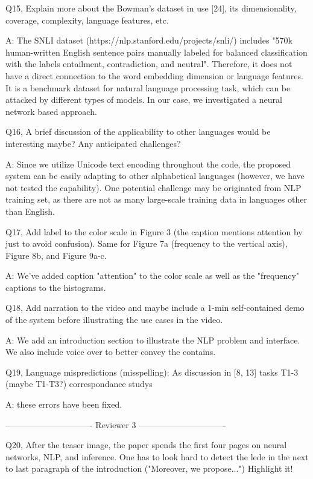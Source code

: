 Q15, Explain more about the Bowman's dataset in use [24], its dimensionality, coverage, complexity, language features, etc.

A: The SNLI dataset (https://nlp.stanford.edu/projects/snli/) includes "570k human-written English sentence pairs manually labeled for balanced classification with the labels entailment, contradiction, and neutral". Therefore, it does not have a direct connection to the word embedding dimension or language features. It is a benchmark dataset for natural language processing task, which can be attacked by different types of models. In our case, we investigated a neural network based approach.

Q16, A brief discussion of the applicability to other languages would be interesting maybe? Any anticipated challenges?

A: Since we utilize Unicode text encoding throughout the code, the proposed system can be easily adapting to other alphabetical languages (however, we have not tested the capability). One potential challenge may be originated from NLP training set, as there are not as many large-scale training data in languages other than English.

Q17, Add label to the color scale in Figure 3 (the caption mentions attention by just to avoid confusion). Same for Figure 7a (frequency to the vertical axis), Figure 8b, and Figure 9a-c.

A: We've added caption "attention" to the color scale as well as the "frequency" captions to the histograms.

Q18, Add narration to the video and maybe include a 1-min self-contained demo of the system before illustrating the use cases in the video.

A: We add an introduction section to illustrate the NLP problem and interface. We also include voice over to better convey the contains.

Q19, Language mispredictions (misspelling):
As discussion in [8, 13]
tasks T1-3 (maybe T1-T3?)
correspondance
studys

A: these errors have been fixed.

------------------------------- Reviewer 3 -------------------------------

Q20, After the teaser image, the paper spends the first four pages on neural networks, NLP, and inference. One has to look hard to detect the lede in the next to last paragraph of the introduction ("Moreover, we propose...") Highlight it!

